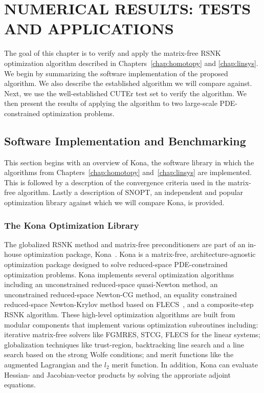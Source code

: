  
\chapter{NUMERICAL RESULTS: TESTS AND APPLICATIONS}
The goal of this chapter is to verify and apply the matrix-free RSNK optimization algorithm described in Chapters~\ref{chap:homotopy} and \ref{chap:linsys}.   We begin by summarizing the software implementation of the proposed algorithm.  We also describe the established algorithm we will compare against.  Next, we use the well-established CUTEr test set to verify the algorithm.  We then present the results of applying the algorithm to two large-scale PDE-constrained optimization problems.

\section{Software Implementation and Benchmarking}

This section begins with an overview of Kona, the software library in which the algorithms from Chapters~\ref{chap:homotopy} and~\ref{chap:linsys} are implemented.  This is followed by a descrption of the convergence criteria used in the matrix-free algorithm. Lastly a description of SNOPT, an independent and popular optimization library against which we will compare Kona, is provided. 

\subsection{The Kona Optimization Library}\label{sec:kona_mv}
The globalized RSNK method and matrix-free preconditioners are part of 
an in-house optimization package, Kona~\cite{dener:scitech2016}. Kona is a matrix-free, 
architecture-agnostic optimization package designed to solve reduced-space PDE-constrained 
optimization problems.  Kona implements several optimization 
algorithms including an unconstrained 
reduced-space quasi-Newton method, an unconstrained reduced-space 
Newton-CG method, an equality constrained reduced-space Newton-Krylov method 
based on FLECS~\cite{hicken:flecs2014}, and a composite-step RSNK algorithm.
These high-level optimization algorithms are built from modular components that implement various optimization subroutines including:
iterative matrix-free solvers like FGMRES, STCG, FLECS for the linear systems; 
globalization techniques like trust-region, backtracking line search and a line search based on 
the strong Wolfe conditions;   and merit functions like the augmented Lagrangian and the $l_2$ 
merit function.  In addition, Kona can evaluate Hessian- and Jacobian-vector products by solving the approriate adjoint equations. 

